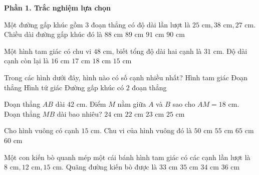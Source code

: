 \textbf{Phần 1. Trắc nghiệm lựa chọn}

\begin{ex} %
Một đường gấp khúc gồm $3$ đoạn thẳng có độ dài lần lượt là $25\text{ cm}, 38\text{ cm}, 27\text{ cm}$. Chiều dài đường gấp khúc đó là
\choice
{$88\text{ cm}$}
{$89\text{ cm}$}
{$91\text{ cm}$}
{\True $90\text{ cm}$}
\end{ex}

\begin{ex} %
Một hình tam giác có chu vi $48\text{ cm}$, biết tổng độ dài hai cạnh là $31\text{ cm}$. Độ dài cạnh còn lại là
\choice
{$16\text{ cm}$}
{\True $17\text{ cm}$}
{$18\text{ cm}$}
{$15\text{ cm}$}
\end{ex}

\begin{ex} %
Trong các hình dưới đây, hình nào có số cạnh nhiều nhất?
\choice
{Hình tam giác}
{Đoạn thẳng}
{\True Hình tứ giác}
{Đường gấp khúc có $2$ đoạn thẳng}
\end{ex}

\begin{ex} %
Đoạn thẳng $AB$ dài $42\text{ cm}$. Điểm $M$ nằm giữa $A$ và $B$ sao cho $AM = 18\text{ cm}$. Đoạn thẳng $MB$ dài bao nhiêu?
\choice
{\True $24\text{ cm}$}
{$22\text{ cm}$}
{$23\text{ cm}$}
{$25\text{ cm}$}
\end{ex}

\begin{ex} %
Cho hình vuông có cạnh $15\text{ cm}$. Chu vi của hình vuông đó là
\choice
{$50\text{ cm}$}
{$55\text{ cm}$}
{$65\text{ cm}$}
{\True $60\text{ cm}$}
\end{ex}

\begin{ex} %
Một con kiến bò quanh mép một cái bánh hình tam giác có các cạnh lần lượt là $8\text{ cm}, 12\text{ cm}, 15\text{ cm}$. Quãng đường kiến bò được là
\choice
{$33\text{ cm}$}
{\True $35\text{ cm}$}
{$34\text{ cm}$}
{$36\text{ cm}$}
\end{ex}

